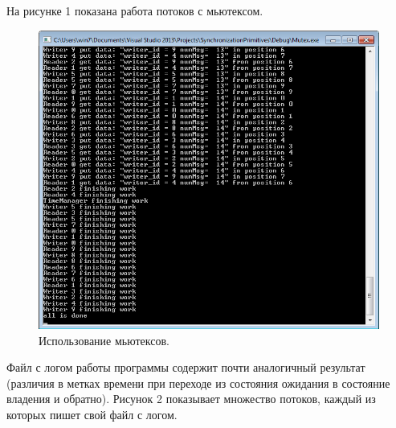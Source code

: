 \documentclass[a4paper, 12pt]{article}		%
\begin{document}
На рисунке 1 показана работа потоков с мьютексом.

\begin{figure}[h!]
\centering
\includegraphics[scale=1]{res/001}
\caption{Использование мьютексов.}
\end{figure}

Файл с логом работы программы содержит почти аналогичный результат (различия в метках времени при переходе из состояния ожидания в состояние владения и обратно). Рисунок 2 показывает множество потоков, каждый из которых пишет свой файл с логом.
\end{document}
